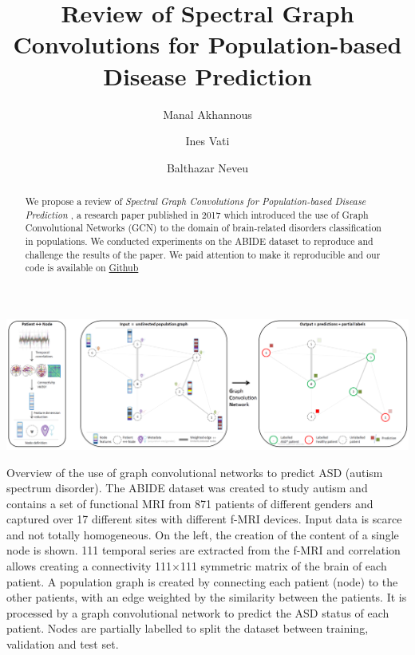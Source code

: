 \documentclass[sigconf,authorversion,nonacm]{acmart}
\begin{document}
\title{Review of Spectral Graph Convolutions for Population-based Disease Prediction}

\author{Manal Akhannous}

\author{Ines Vati}

\author{Balthazar Neveu}


\renewcommand{\shortauthors}{Akhannous, Vati, Neveu}

\begin{abstract}
We propose a review of \textit{Spectral Graph Convolutions for Population-based Disease Prediction} \cite{Parisot17},
a research paper published in 2017 which introduced the use of Graph Convolutional Networks (GCN)
to the domain of brain-related disorders classification in populations.
We conducted experiments on the ABIDE dataset to reproduce and challenge the results of the paper.
We paid attention to make it reproducible and our code is available on \href{https://github.com/balthazarneveu/spectral_graph_convolutions}{Github}

\end{abstract}

\begin{teaserfigure}
  \includegraphics[width=\textwidth]{figures/spectral_graph_convolution_graph_overview.png}
  \caption{Overview of the use of graph convolutional networks to predict ASD (autism spectrum disorder).
  The ABIDE dataset was created to study autism and contains a set of functional MRI from 871 patients 
  of different genders and captured over 17 different sites with different f-MRI devices. Input data is scarce and not totally homogeneous.
  On the left, the creation of the content of a single node is shown. 111 temporal series are extracted from the f-MRI and correlation allows creating a connectivity 111×111 symmetric matrix of the brain of each patient.
  A population graph is created by connecting each patient (node) to the other patients, with an edge weighted by the similarity between the patients.
  It is processed by a graph convolutional network to predict the ASD status of each patient.
  Nodes are partially labelled to split the dataset between training, validation and test set.
  }
  \Description{}
  \label{fig:overview}
\end{teaserfigure}
\end{document}
